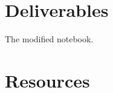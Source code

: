 \section{Deliverables}
The modified notebook.

\section{Resources}
\renewcommand{\addcontentsline}[3]{} %



\begin{comment}
\section{Distortion control}
We do not provide any accurate distortion control algorithm. Our
compressor is able to control the number of gray tones in the
reconstructed image, using a deadzone scalar quantizer. The
quantization steps are selected simulating a
\href{https://en.wikipedia.org/wiki/Bit_plane}{bit-plane}
encoding. Therefore, for 8-bit images, the quantization steps are
$\Delta\in\{128, 64, 32, 16, 8, 4, 2, 1\}$ (powers of $2$). Notice
that we cannot control the distortion in terms of the RMSE, for
example.

\section{Rate control}
The bit-rate (the number of bits/pixel) obtained after using
scalar quantization quantization and PNG depends on:
\begin{enumerate}
\item The number of output indexes generated by the quantizer.
\item The capability of PNG for removing spatial/statistical
  redudancy, aspect that we cannot control with accuracy (only some
  levels of compression are usually available).
\item In the case of SQ, the quantization step size $\Delta$
  used. Notice that, usually, the higher the $\Delta$, the higher the
  compression ratio, the lower the number of bits/pixel, and the lower
  the quality of the reconstructed image.
\end{enumerate}

Therefore, variying $\Delta$ we should be able to generate a Rate/Distortion (RD)
curve~\cite{vruiz__information_theory}, where the $x$-axis represents the bit-rate (in bit/pixel, for
example) and the $y$-axis represents the distortion (the
\href{https://en.wikipedia.org/wiki/Root-mean-square_deviation}{Root
  Mean Square Error (RMSE)}, for example). However, notice that only seven RD points will be available\footnote{This is a direct consequence of using bit-plane encoding.}, and the rate of each point is not controllable.\footnote{Because we cannot control the bit-rate with PNG.}
\end{comment}
